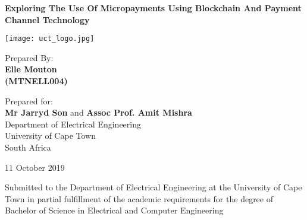 \begin{titlepage}
    \begin{center}
        \vspace*{1cm}
        
        \LARGE
        \textbf{Exploring The Use Of Micropayments Using Blockchain And Payment Channel Technology}
        
        \vspace{1cm}
        
        \texttt{[image: uct\_logo.jpg]}
        
        \vspace{1cm}
        
        \large
        Prepared By:\\ 
        \textbf{Elle Mouton}\\
        \textbf{(MTNELL004)}
        
        
        \vfill 
        Prepared for: \\
        \textbf{Mr Jarryd Son} and \textbf{Assoc Prof. Amit Mishra}\\
        Department of Electrical Engineering\\
        University of Cape Town\\
        South Africa
        
        \vspace{1.5cm}
        
        11 October 2019
        
         \vspace{1.5cm}
        Submitted to the Department of Electrical Engineering at the University of Cape Town in partial fulfillment of the academic requirements for the degree of Bachelor of Science in Electrical and Computer Engineering
        
    \end{center}
\end{titlepage}